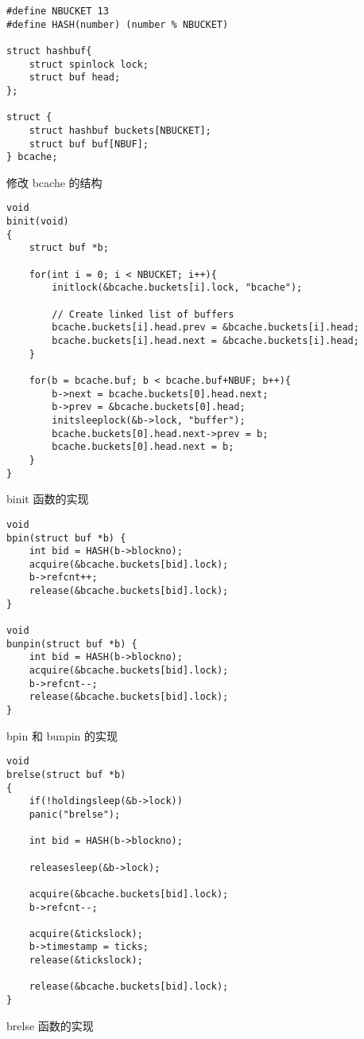 \begin{listing}[!htb]
	\begin{verbatim}
#define NBUCKET 13
#define HASH(number) (number % NBUCKET)

struct hashbuf{
    struct spinlock lock;
    struct buf head;
};

struct {
    struct hashbuf buckets[NBUCKET];
    struct buf buf[NBUF];
} bcache;
	\end{verbatim}
	\caption{修改 bcache 的结构}\label{lst:hashbuf}
\end{listing}

\begin{listing}[!htb]
	\begin{verbatim}
void
binit(void)
{
    struct buf *b;

    for(int i = 0; i < NBUCKET; i++){
        initlock(&bcache.buckets[i].lock, "bcache");

        // Create linked list of buffers
        bcache.buckets[i].head.prev = &bcache.buckets[i].head;
        bcache.buckets[i].head.next = &bcache.buckets[i].head;
    }

    for(b = bcache.buf; b < bcache.buf+NBUF; b++){
        b->next = bcache.buckets[0].head.next;
        b->prev = &bcache.buckets[0].head;
        initsleeplock(&b->lock, "buffer");
        bcache.buckets[0].head.next->prev = b;
        bcache.buckets[0].head.next = b;
    }
}
	\end{verbatim}
	\caption{binit 函数的实现}\label{lst:bcache}
\end{listing}

\begin{listing}[!htb]
	\begin{verbatim}
void
bpin(struct buf *b) {
    int bid = HASH(b->blockno);
    acquire(&bcache.buckets[bid].lock);
    b->refcnt++;
    release(&bcache.buckets[bid].lock);
}

void
bunpin(struct buf *b) {
    int bid = HASH(b->blockno);
    acquire(&bcache.buckets[bid].lock);
    b->refcnt--;
    release(&bcache.buckets[bid].lock);
}
	\end{verbatim}
	\caption{bpin 和 bunpin 的实现}\label{lst:bpin_and_bunpin}
\end{listing}

\begin{listing}[!htb]
	\begin{verbatim}
void
brelse(struct buf *b)
{
    if(!holdingsleep(&b->lock))
    panic("brelse");

    int bid = HASH(b->blockno);

    releasesleep(&b->lock);
    
    acquire(&bcache.buckets[bid].lock);
    b->refcnt--;

    acquire(&tickslock);
    b->timestamp = ticks;
    release(&tickslock);

    release(&bcache.buckets[bid].lock);
}
	\end{verbatim}
	\caption{brelse 函数的实现}\label{lst:brelse}
\end{listing}

